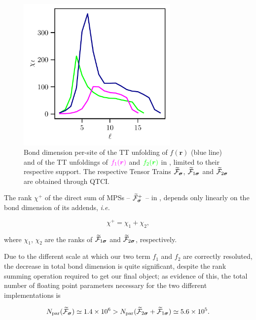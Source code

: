 \begin{figure}[ht!]
	\centering
	\includegraphics[width=0.7\textwidth]{figures/bonddim_localised_func+bonddim_patches.pdf}
	\caption{Bond dimension per-site of the TT unfolding of $f(\boldsymbol{r})$ (blue line) and of the TT unfoldings of ${\color{mymagenta}f_1(\boldsymbol{r})}$ and ${\color{green} f_2(\boldsymbol{r})}$ in , limited to their respective support. The respective Tensor Trains  $\widetilde{\mathcal{F}}_{\boldsymbol{\sigma}}$, $\widetilde{\mathcal{F}}_{1\boldsymbol{\sigma}}$ and $\widetilde{\mathcal{F}}_{2\boldsymbol{\sigma}}$ are obtained through QTCI. }
	\label{fig:bondDimLocalFunc}
\end{figure}

The rank $\chi^+$ of the direct sum of MPSs -- $\widetilde{\mathcal{F}}^+_{\boldsymbol{\sigma}}$ -- in , depends only linearly on the bond dimension of its addends, \textit{i.e.}

\begin{equation}
	\chi^+ = \chi_1 + \chi_2,
\end{equation}

where $\chi_1$, $\chi_2$ are the ranks of $\widetilde{\mathcal{F}}_{1\boldsymbol{\sigma}}$ and $\widetilde{\mathcal{F}}_{2\boldsymbol{\sigma}}$, respectively. 

Due to the different scale at which our two term $f_1$ and $f_2$ are correctly resoluted, the decrease in total bond dimension is quite significant, despite the rank summing operation required to get our final object; as evidence of this, the total number of floating point parameters necessary for the two different implementations is 

\begin{equation}
	N_{\text{par}}(\widetilde{\mathcal{F}}_{\boldsymbol{\sigma}}) \simeq 1.4 \times 10^6 > N_{\text{par}}(\widetilde{\mathcal{F}}_{2\boldsymbol{\sigma}} + \widetilde{\mathcal{F}}_{1\boldsymbol{\sigma}}) \simeq 5.6 \times 10^5.
	\label{eq:naiveLocalFuncMemorySave}
\end{equation}




